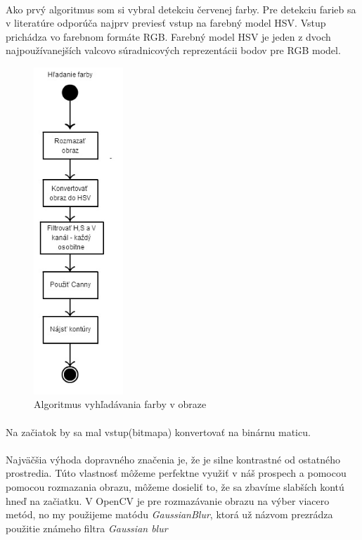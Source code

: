 \documentclass[12pt]{article}
\begin{document}
\paragraph{}
Ako prvý algoritmus som si vybral detekciu červenej farby. Pre detekciu farieb sa v literatúre odporúča najprv previesť vstup na farebný model HSV. 
Vstup prichádza vo farebnom formáte RGB. Farebný model HSV je jeden z dvoch najpoužívanejších valcovo súradnicových reprezentácii bodov pre RGB model.
\cite{hsl_hsv_wiki_en}
\begin{figure}[p]
\centering
\includegraphics[width=0.3\textwidth,natwidth=160,natheight=586]{hladanie_farby.jpg}
\vspace{-20pt}
\caption{Algoritmus vyhľadávania farby v obraze}
\vspace{-10pt}
\label{hladanie_farby}
\end{figure}
\paragraph{}
Na začiatok by sa mal vstup(bitmapa) konvertovať na binárnu maticu.
\paragraph{}
Najväčšia výhoda dopravného značenia je, že je silne kontrastné od ostatného prostredia.
Túto vlastnosť môžeme perfektne využiť v náš prospech a pomocou pomocou rozmazania obrazu, môžeme dosieliť to,
že sa zbavíme slabších kontú hneď na začiatku. V OpenCV je pre rozmazávanie obrazu na výber viacero metód,
no my použijeme matódu \emph{GaussianBlur}, ktorá už názvom prezrádza použitie známeho filtra \emph{Gaussian blur}
\end{document}
